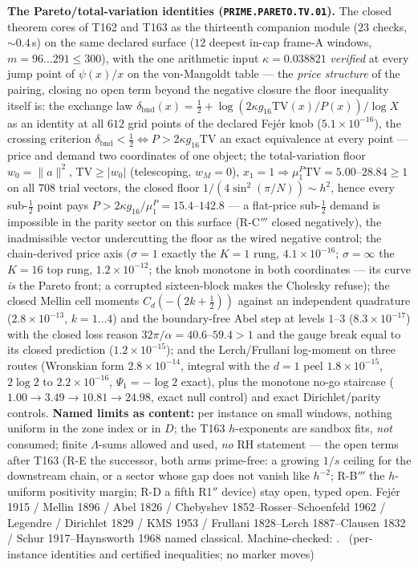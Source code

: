 \documentclass[11pt,a4paper]{article}
\theoremstyle{definition}
\begin{document}
\par\smallskip\noindent\textbf{The Pareto/total-variation identities
(\texttt{PRIME.PARETO.TV.01}).}
The closed theorem cores of T162 and T163 as the thirteenth companion
module ($23$ checks, ${\sim}0.4$\,s) on the same declared surface ($12$
deepest in-cap frame-A windows, $m=96\ldots291\le300$), with the one
arithmetic input $\kappa=0.038821$ \emph{verified} at every jump point
of $\psi(x)/x$ on the von-Mangoldt table --- the \emph{price structure}
of the pairing, closing no open term beyond the negative closure the
floor inequality itself is: the exchange law
$\delta_{\mathrm{bnd}}(x)=\tfrac12+\log(2\kappa g_{16}\mathrm{TV}(x)/P(x))/\log X$
as an identity at all $612$ grid points of the declared Fej\'er knob
($5.1\times10^{-16}$), the crossing criterion
$\delta_{\mathrm{bnd}}<\tfrac12\iff P>2\kappa g_{16}\mathrm{TV}$ an
exact equivalence at every point --- price and demand two coordinates of
one object; the total-variation floor $w_0=\|a\|^2$, $\mathrm{TV}\ge
|w_0|$ (telescoping, $w_M=0$), $x_1=1\Rightarrow
\mu^P_1\mathrm{TV}=5.00$--$28.84\ge1$ on all $708$ trial vectors, the
closed floor $1/(4\sin^2(\pi/N))\sim h^2$, hence every sub-$\tfrac12$
point pays $P>2\kappa g_{16}/\mu^P_1=15.4$--$142.8$ --- a flat-price
sub-$\tfrac12$ demand is impossible in the parity sector on this
surface (R-C$'''$ closed negatively), the inadmissible vector
undercutting the floor as the wired negative control; the chain-derived
price axis ($\sigma=1$ exactly the $K=1$ rung, $4.1\times10^{-16}$;
$\sigma=\infty$ the $K=16$ top rung, $1.2\times10^{-12}$; the knob
monotone in both coordinates --- its curve \emph{is} the Pareto front;
a corrupted sixteen-block makes the Cholesky refuse); the closed Mellin
cell moments $C_d(-(2k+\tfrac12))$ against an independent quadrature
($2.8\times10^{-13}$, $k=1\ldots4$) and the boundary-free Abel step at
levels $1$--$3$ ($8.3\times10^{-17}$) with the closed loss reason
$32\pi/\alpha=40.6$--$59.4>1$ and the gauge break equal to its closed
prediction ($1.2\times10^{-15}$); and the Lerch/Frullani log-moment on
three routes (Wronskian form $2.8\times10^{-14}$, integral with the
$d=1$ peel $1.8\times10^{-15}$, $2\log2$ to $2.2\times10^{-16}$,
$\Psi_1=-\log2$ exact), plus the monotone no-go staircase
($1.00\to3.49\to10.81\to24.98$, exact null control) and exact
Dirichlet/parity controls.
\textbf{Named limits as content:} per instance on small windows,
nothing uniform in the zone index or in $D$; the T163 $h$-exponents
are sandbox fits, \emph{not} consumed; finite $\Lambda$-sums allowed
and used, \emph{no} RH statement --- the open terms after T163 (R-E the
successor, both arms prime-free: a growing $1/s$ ceiling for the
downstream chain, or a sector whose gap does not vanish like $h^{-2}$;
R-B$'''$ the $h$-uniform positivity margin; R-D a fifth R1$''$ device)
stay open, typed open.
Fej\'er 1915 / Mellin 1896 / Abel 1826 / Chebyshev
1852--Rosser--Schoenfeld 1962 / Legendre / Dirichlet 1829 / KMS 1953 /
Frullani 1828--Lerch 1887--Clausen 1832 / Schur 1917--Haynsworth 1968
named classical. Machine-checked:
.
\mE\ (per-instance identities and certified inequalities; no marker moves)
\par\smallskip
\end{document}

